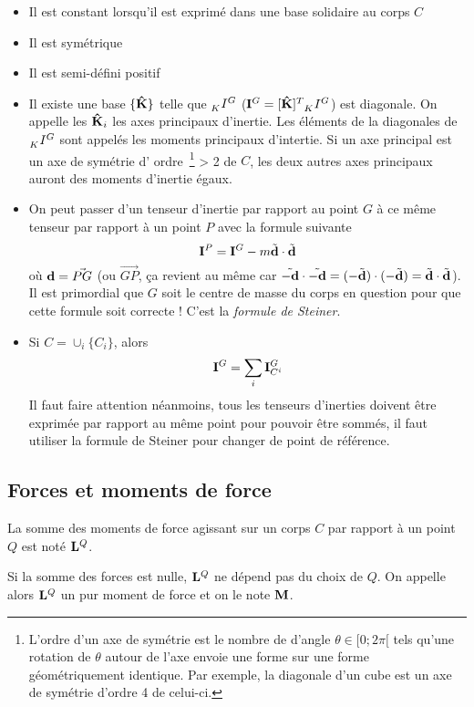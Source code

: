 \begin{itemize}
	\item Il est constant lorsqu'il est exprimé dans une base solidaire au corps $C$
	\item Il est symétrique
	\item Il est semi-défini positif
	\item
		Il existe une base $\{{\bf\hat{K}}\}$ telle que $\wtr{K}{I}{G}$ ($\ine^G = [\uk]^T \wtr{K}{I}{G}$) est diagonale.
		On appelle les ${\bf\hat{K}}_i$ les axes principaux d'inertie.
		Les éléments de la diagonales de $\wtr{K}{I}{G}$ sont appelés les moments principaux d'intertie.
		Si un axe principal est un axe de symétrie d'
		ordre~\footnote{L'ordre d'un axe de symétrie est le nombre de d'angle $\theta \in [0; 2\pi[$ tels qu'une rotation de $\theta$ autour de l'axe envoie une forme sur une forme géométriquement identique.
		Par exemple, la diagonale d'un cube est un axe de symétrie d'ordre 4 de celui-ci.}
		> 2 de $C$, les deux autres axes principaux auront des moments d'inertie égaux.
	\item
		On peut passer d'un tenseur d'inertie par rapport au point $G$ à ce même tenseur par rapport à un point $P$ avec la formule suivante
		\[ {\bf I}^P =  {\bf I}^G - m \tilde{{\bf d}}\cdot\tilde{{\bf d}} \]
		où ${\bf d} = \vec{PG}$ (ou $\vec{GP}$, ça revient au même car $\tilde{-{\bf d}}\cdot\tilde{-{\bf d}} = (-\tilde{{\bf d}})\cdot(-\tilde{{\bf d}}) = \tilde{{\bf d}}\cdot\tilde{{\bf d}}$).
		Il est primordial que $G$ soit le centre de masse du corps en question pour que cette formule soit correcte !
		C'est la {\em formule de Steiner}.
	\item
		Si $C = \cup_i \{C_i\}$, alors
		\[ {\bf I}^G = \sum_i {\bf I}_{C^i}^G \]
		Il faut faire attention néanmoins, tous les tenseurs d'inerties doivent être exprimée par rapport au même point pour pouvoir être sommés, il faut utiliser la formule de Steiner pour changer de point de référence.
\end{itemize}

\subsection{Forces et moments de force}
La somme des moments de force agissant sur un corps $C$ par rapport à un point $Q$ est noté ${\bf L}^Q$.

Si la somme des forces est nulle, ${\bf L}^Q$ ne dépend pas du choix de $Q$.
On appelle alors ${\bf L}^Q$ un pur moment de force et on le note ${\bf M}$.

